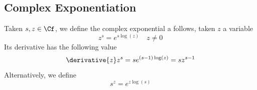 \documentclass[../mmf.tex]{subfiles}
\begin{document}
\subsection{Complex Exponentiation}
\begin{dfn}
	Taken $s,z\in\Cf$, we define the complex exponential a follows, taken $z$ a variable
	\begin{equation}
		z^s=e^{s\log(z)}\quad z\ne0
		\label{eq:complexexp}
	\end{equation}
	Its derivative has the following value
	\begin{equation}
		\derivative{z}z^s=se^{(s-1)\log(z)}=sz^{s-1}
		\label{eq:complexexpder}
	\end{equation}
	Alternatively, we define
	\begin{equation}
		s^z=e^{z\log(s)}
		\label{eq:revexpcf}
	\end{equation}
\end{dfn}
\end{document}
